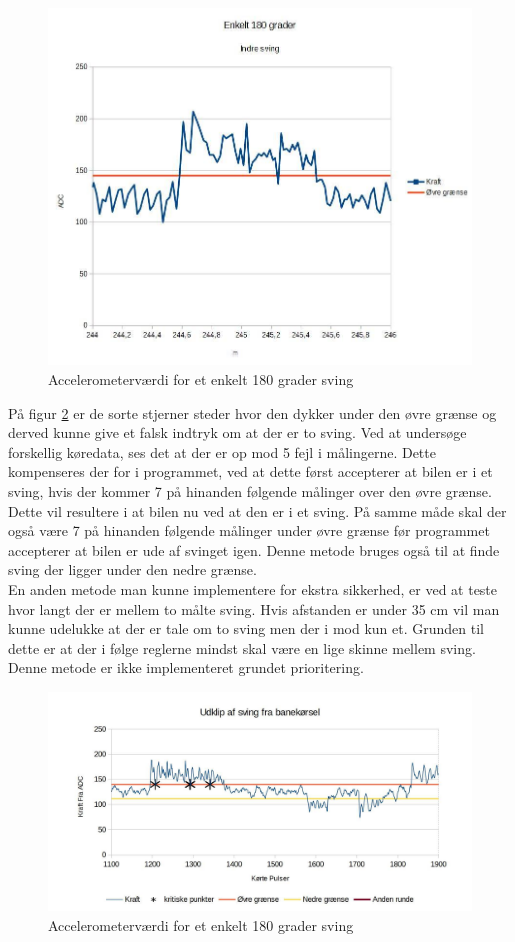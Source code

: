 \begin{figure}[h!]
\center
\includegraphics[scale=0.2]{./Graphics/Enkelt180grader}
\caption{Accelerometerværdi for et enkelt 180 grader sving}
\label{180grader}
\end{figure}

På figur \ref{Stjerne} er de sorte stjerner steder hvor den dykker under den øvre grænse og derved kunne give et falsk indtryk om at der er to sving. Ved at undersøge forskellig køredata, ses det at der er op mod 5 fejl i målingerne. Dette kompenseres der for i programmet, ved at dette først accepterer at bilen er i et sving, hvis der kommer 7 på hinanden følgende målinger over den øvre grænse. Dette vil resultere i at bilen nu ved at den er i et sving. På samme måde skal der også være 7 på hinanden følgende målinger under øvre grænse før programmet accepterer at bilen er ude af svinget igen. Denne metode bruges også til at finde sving der ligger under den nedre grænse. \\ 

En anden metode man kunne implementere for ekstra sikkerhed, er ved at teste hvor langt der er mellem to målte sving. Hvis afstanden er under 35 cm vil man kunne udelukke at der er tale om to sving men der i mod kun et. Grunden til dette er at der i følge reglerne mindst skal være en lige skinne mellem sving. Denne metode er ikke implementeret grundet prioritering.\\

\begin{figure}[h!]
\center
\includegraphics[scale=0.2]{./Graphics/sortestjerne}
\caption{Accelerometerværdi for et enkelt 180 grader sving}
\label{Stjerne}
\end{figure}

